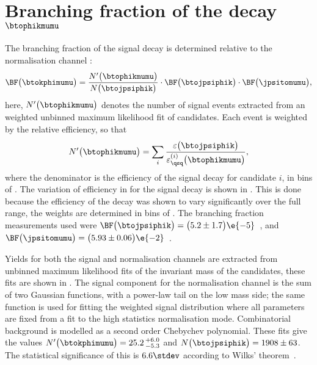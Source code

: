 \section[Branching fraction of the decay \btophikmumu]
{Branching fraction of the decay $\boldsymbol{\btophikmumu}$}

The branching fraction of the signal decay \btophikmumu is determined relative to the normalisation
channel \btojpsiphik:
\begin{equation}
  \BF\big(\btokphimumu\big)=
  \frac{ N^\prime\big(\btophikmumu\big) }{ N\big(\btojpsiphik\big) }
  \cdot\BF\big(\btojpsiphik\big)
  \cdot\BF\big(\jpsitomumu\big),
\end{equation}
here, $N^\prime\big(\btophikmumu\big)$ denotes the number of signal events extracted from an
weighted unbinned maximum likelihood fit of \btophikmumu candidates.
Each event is weighted by the relative efficiency, so that
\begin{equation}
  N^\prime\big(\btophikmumu\big)
  =
  \sum_i\frac{\varepsilon\big(\btojpsiphik\big)}{\varepsilon_{\qsq}^{(i)}\big(\btophikmumu\big)},
\end{equation}
where the denominator is the efficiency of the signal decay for candidate $i$, in bins of \qsq.
The variation of efficiency in \qsq for the signal decay is shown in
.
This is done because the efficiency of the decay \btophikmumu was shown to vary significantly over
the full \qsq range, the weights are determined in bins of \qsq.
The branching fraction measurements used were
$\BF\big(\btojpsiphik\big)=\big(5.2\pm1.7\big)\e{-5}$~\cite{PDG2012},
and $\BF\big(\jpsitomumu\big)=\big(5.93\pm0.06\big)\e{-2}$~\cite{PDG2012}.

Yields for both the signal and normalisation channels are extracted from unbinned maximum
likelihood fits of the invariant mass of the \Bp candidates, these fits are shown in
.
The signal component for the normalisation channel is the sum of two Gaussian functions, with a
power-law tail on the low mass side; the same function is used for fitting the weighted signal
distribution where all parameters are fixed from a fit to the high statistics normalisation mode.
Combinatorial background is modelled as a second order Chebychev polynomial.
These fits give the values
$N^\prime\big(\btokphimumu\big)=25.2\,^{+6.0}_{-5.3}$ and
$N\big(\btojpsiphik\big)=1908\pm63$.
The statistical significance of this is $6.6\stdev$ according to Wilks' theorem~\cite{wilks1938}.

